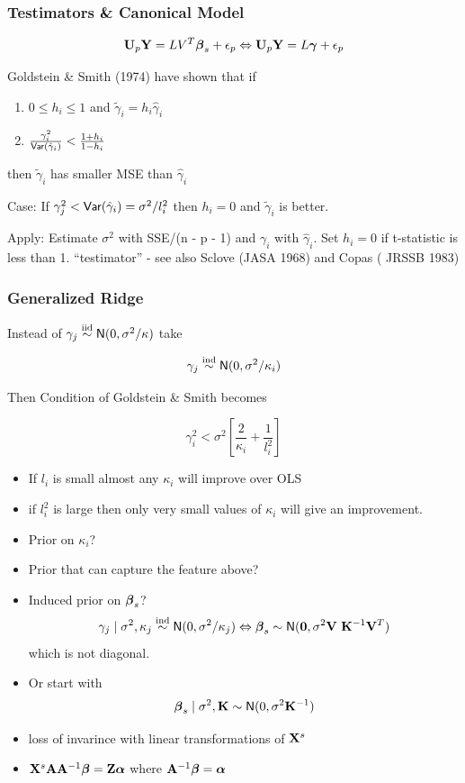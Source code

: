 \documentclass[handout]{beamer}\usepackage[]{graphicx}\usepackage[]{color}
\begin{document}
\begin{frame} \frametitle{Testimators \& Canonical Model}

$$\mathbf{U}_p \mathbf{Y} = L V^T \boldsymbol{\beta}_s + \epsilon_p \Leftrightarrow \mathbf{U}_p \mathbf{Y} = L\boldsymbol{\gamma} + \epsilon_p$$

Goldstein \& Smith (1974) have shown that if

\begin{enumerate}
\item
$0 \leq  h_i \leq 1$ and  $\tilde{\gamma}_i = h_i \hat{\gamma}_i$
\item $\frac{\gamma^2_i}{\textsf{Var}(\hat{\gamma}_i)} < \frac{1 + h_i}{1 - h_i}$
\end{enumerate}
then   $\tilde{\gamma}_i$ has smaller MSE than $\hat{\gamma}_i$

\vspace{14pt}
Case:  If $\gamma_j^2 < \textsf{Var}(\hat{\gamma}_i) = \sigma^2/l_i^2$  then
$h_i = 0$ and $\tilde{\gamma}_i$ is better.

\vspace{11pt}
Apply: Estimate $\sigma^2$ with SSE/(n - p - 1) and $\gamma_i$ with
$\hat{\gamma}_i$.  Set $h_i = 0$ if t-statistic is less than 1.
\vfill
``testimator'' - see also Sclove (JASA 1968) and Copas ( JRSSB 1983)
\end{frame}
\begin{frame} \frametitle{Generalized Ridge}


Instead of $\gamma_j \mathrel{\mathop{\sim}\limits^{\rm iid}} \textsf{N}(0, \sigma^2/\kappa)$ take

$$\gamma_j \mathrel{\mathop{\sim}\limits^{\rm ind}} \textsf{N}(0, \sigma^2/\kappa_i)$$  \pause

Then Condition of Goldstein \& Smith becomes

$$
\gamma_i^2 < \sigma^2\left[ \frac{2}{\kappa_i} + \frac{1}{l_i^2}  \right]
$$ \pause
\begin{itemize}
\item
If $l_i$ is small almost any $\kappa_i$ will improve over OLS \pause
\item
if $l_i^2$ is large then only very small values of $\kappa_i$ will give an
improvement. \pause
\item Prior on $\kappa_i$?   \pause
\item Prior that can capture the feature above?

\end{itemize}

\end{frame}
\begin{frame}
  \begin{itemize}
\item Induced prior on $\boldsymbol{\beta}_s$?
$$\gamma_j \mid \sigma^2, \kappa_j  \mathrel{\mathop{\sim}\limits^{\rm ind}} \textsf{N}(0, \sigma^2/\kappa_j) \Leftrightarrow
\boldsymbol{\beta}_s \sim \textsf{N}(\mathbf{0}, \sigma^2 \mathbf{V}\ \mathbf{K}^{-1} \mathbf{V}^T)$$
which is not diagonal.
  \item  Or start with $$\boldsymbol{\beta}_s  \mid \sigma^2, \mathbf{K} \sim \textsf{N}(0, \sigma^2 \mathbf{K}^{-1})$$
 \item loss of invarince with linear transformations of $\mathbf{X}^s$
\item $\mathbf{X}^s \mathbf{A} \mathbf{A}^{-1} \boldsymbol{\beta} = \mathbf{Z} \boldsymbol{\alpha}$ where $\mathbf{A}^{-1} \boldsymbol{\beta} = \boldsymbol{\alpha}$
  \end{itemize}
\end{frame}
\end{document}
